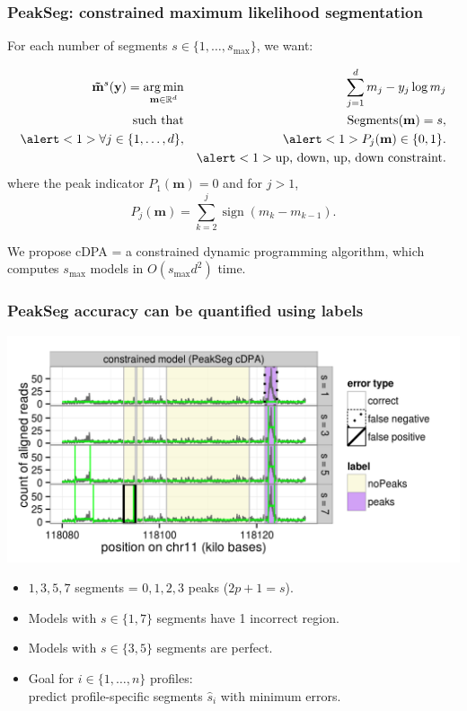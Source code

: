 \documentclass{beamer}
\DeclareMathOperator*{\argmin}{arg\,min}
\DeclareMathOperator*{\Lik}{Lik}
\DeclareMathOperator*{\Segments}{Segments}
\newcommand{\sign}{\operatorname{sign}}
\newcommand{\RR}{\mathbb R}
\begin{document}
\begin{frame}[fragile]
  \frametitle{PeakSeg:  constrained maximum likelihood
    segmentation}
For each number of segments $s\in\{1, \dots,
  s_{\text{max}}\}$, we want:

  \begin{eqnarray*}
  \label{PeakSeg}
  \mathbf{\tilde m}^s(\mathbf y)  =
    \argmin_{\mathbf m\in\RR^{d}}& &\ \ 
\sum_{j=1}^d
      m_j - y_j \log m_j
\\
    \text{such that}& &\ \  \Segments(\mathbf m)=s,  \\
    \alert<1>{\forall j\in\{1, \dots, d\},} & &
    \ \ \alert<1>{P_j(\mathbf m) \in\{0, 1\}.}\\
    && \alert<1>{\text{up, down, up, down constraint.}}
   \end{eqnarray*}
where the peak indicator $P_1(\mathbf m)=0$ and for $j>1$,
\begin{equation*}
  \label{eq:peaks}
  P_j(\mathbf m) = \sum_{k=2}^j \sign( m_{k} - m_{k-1} ).
\end{equation*}

We propose cDPA = a constrained dynamic programming algorithm, which
computes $s_{\text{max}}$ models in $O(s_{\text{max}} d^2)$ time.

\end{frame}

\begin{frame}
  \frametitle{PeakSeg accuracy can be quantified using labels}
  \includegraphics[width=\textwidth]{figure-Segmentor-PeakSeg-constrained-regions}

  \begin{itemize}
  \item $1, 3, 5, 7$ segments = $0, 1, 2, 3$ peaks ($2p + 1 = s$).
  \item Models with $s\in\{1, 7\}$ segments have 1 incorrect region.
  \item Models with $s\in\{3, 5\}$ segments are perfect.
  \item Goal for $i\in\{1, \dots, n\}$ profiles:\\
    predict profile-specific segments $\hat s_i$ with minimum errors.
  \end{itemize}
\end{frame}
\end{document}
